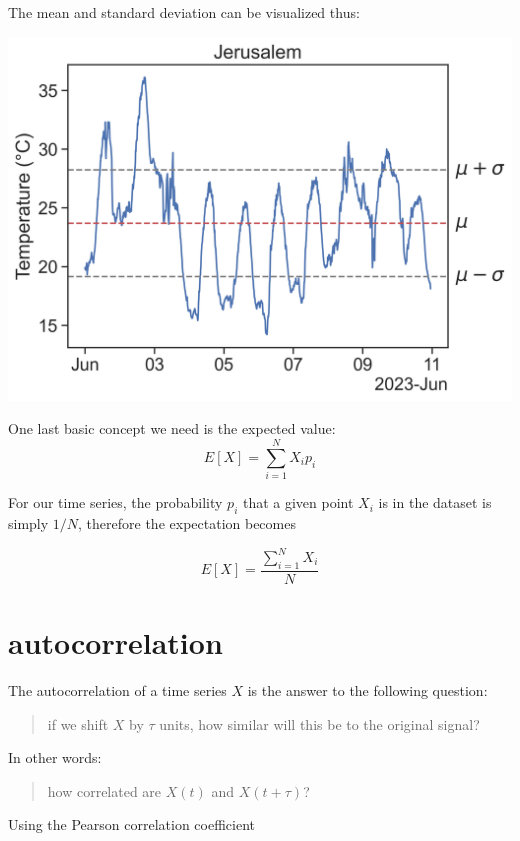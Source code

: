 \documentclass[
  letterpaper,
  DIV=11,
  numbers=noendperiod,
  oneside]{scrreprt}
\begin{document}
The mean and standard deviation can be visualized thus:

\includegraphics{stationarity/jer_temp2.png}

One last basic concept we need is the expected value: \[
E[X] = \sum_{i=1}^N X_i p_i
\]

For our time series, the probability \(p_i\) that a given point \(X_i\)
is in the dataset is simply \(1/N\), therefore the expectation becomes

\[
E[X] = \frac{\displaystyle\sum_{i=1}^N X_i}{N}
\]

\hypertarget{autocorrelation-1}{%
\section{autocorrelation}\label{autocorrelation-1}}

The autocorrelation of a time series \(X\) is the answer to the
following question:

\begin{quote}
if we shift \(X\) by \(\tau\) units, how similar will this be to the
original signal?
\end{quote}

In other words:

\begin{quote}
how correlated are \(X(t)\) and \(X(t+\tau)\)?
\end{quote}

Using the Pearson correlation coefficient

\end{document}
